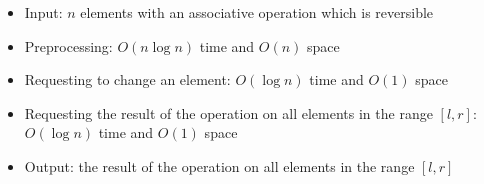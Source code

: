 \begin{itemize}
	\item Input: $n$ elements with an associative operation which is reversible
	\item Preprocessing: $O(n\log{n})$ time and $O(n)$ space
	\item Requesting to change an element: $O(\log{n})$ time and $O(1)$ space
	\item Requesting the result of the operation on all elements in the range $[l,r]$: $O(\log{n})$ time and $O(1)$ space
	\item Output: the result of the operation on all elements in the range $[l,r]$
\end{itemize}